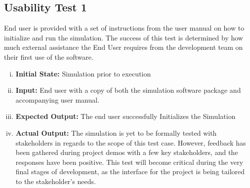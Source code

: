 \documentclass[paper=letter, fontsize=10pt]{scrartcl}
\numberwithin{equation}{section}		%
\numberwithin{figure}{section}			%
\numberwithin{table}{section}				%
\begin{document}
\begin{enumerate}[(i)]
\subsection{Usability Test 1}
End user is provided with a set of instructions from the user manual on how to initialize and run the simulation. The success of this test is determined by how much external assistance the End User requires from the development team on their first use of the software. 
\begin{enumerate}[(i)]
	\item \textbf{Initial State:} Simulation prior to execution
	\item \textbf{Input:} End user with a copy of both the simulation software package and accompanying user manual.
	\item \textbf{Expected Output:} The end user successfully Initializes the Simulation
	\item \textbf{Actual Output:} The simulation is yet to be formally tested with stakeholders in regards to the scope of this test case. However, feedback has been gathered during project demos with a few key stakeholders, and the responses have been positive. This test will become critical during the very final stages of development, as the interface for the project is being tailored to the stakeholder's needs.
\end{enumerate}


\end{enumerate}
\end{document}
